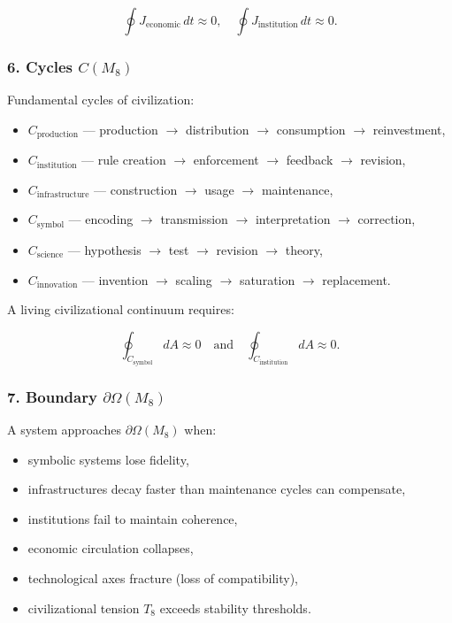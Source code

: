 \[
\oint J_{\mathrm{economic}} \, dt \approx 0,
\quad
\oint J_{\mathrm{institution}} \, dt \approx 0.
\]

\subsubsection*{6. Cycles \texorpdfstring{$C(M_8)$}{C(M_8)}}

Fundamental cycles of civilization:

\begin{itemize}
    \item $C_{\mathrm{production}}$ — production $\to$ distribution $\to$ consumption $\to$ reinvestment,
    \item $C_{\mathrm{institution}}$ — rule creation $\to$ enforcement $\to$ feedback $\to$ revision,
    \item $C_{\mathrm{infrastructure}}$ — construction $\to$ usage $\to$ maintenance,
    \item $C_{\mathrm{symbol}}$ — encoding $\to$ transmission $\to$ interpretation $\to$ correction,
    \item $C_{\mathrm{science}}$ — hypothesis $\to$ test $\to$ revision $\to$ theory,
    \item $C_{\mathrm{innovation}}$ — invention $\to$ scaling $\to$ saturation $\to$ replacement.
\end{itemize}

A living civilizational continuum requires:

\[
\oint_{C_{\mathrm{symbol}}} dA \approx 0
\quad\text{and}\quad
\oint_{C_{\mathrm{institution}}} dA \approx 0.
\]

\subsubsection*{7. Boundary \texorpdfstring{$\partial\Omega(M_8)$}{\partial\Omega(M_8)}}

A system approaches $\partial\Omega(M_8)$ when:

\begin{itemize}
    \item symbolic systems lose fidelity,
    \item infrastructures decay faster than maintenance cycles can compensate,
    \item institutions fail to maintain coherence,
    \item economic circulation collapses,
    \item technological axes fracture (loss of compatibility),
    \item civilizational tension $T_8$ exceeds stability thresholds.
\end{itemize}

